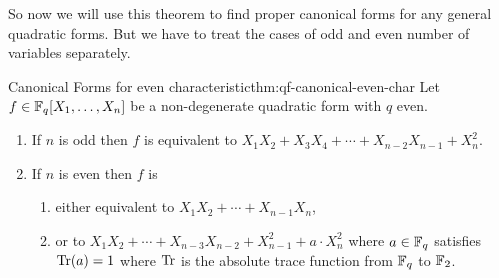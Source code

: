 So now we will use this theorem to find proper canonical forms for any general quadratic forms. But we have to treat the cases of odd and even number of variables separately. 
\begin{Theorem}{Canonical Forms for even characteristic}{thm:qf-canonical-even-char}
  Let $f\in\mathbb{F}_q[X_1,\dots,X_n]$ be a non-degenerate quadratic form with $q$ even.
  \begin{enumerate}[label=(\roman*)]
    \item If $n$ is odd then $f$ is equivalent to $X_1X_2+X_3X_4+\cdots +X_{n-2}X_{n-1}+X_n^2$.
    \item If $n$ is even then $f$ is \begin{enumerate}
      \item either equivalent to $X_1X_2+\cdots+X_{n-1}X_n$, 
      \item or to $X_1X_2+\cdots+X_{n-3}X_{n-2}+X_{n-1}^2+a\cdot X_n^2$ where $a\in\mathbb{F}_q$ satisfies $\operatorname{Tr}(a)=1$ where $\operatorname{Tr}$ is the absolute trace function from $\mathbb{F}_q$ to $\mathbb{F}_2$. 
    \end{enumerate}
  \end{enumerate}
\end{Theorem}
